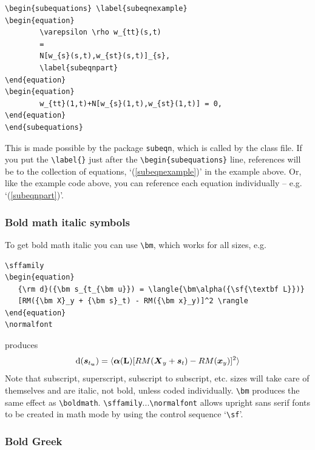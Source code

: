 \documentclass[]{tRSL2e}
\begin{document}
\begin{verbatim}
\begin{subequations} \label{subeqnexample}
\begin{equation}
        \varepsilon \rho w_{tt}(s,t)
        =
        N[w_{s}(s,t),w_{st}(s,t)]_{s},
        \label{subeqnpart}
\end{equation}
\begin{equation}
        w_{tt}(1,t)+N[w_{s}(1,t),w_{st}(1,t)] = 0,
\end{equation}
\end{subequations}
\end{verbatim}
This is made possible by the package {\tt{subeqn}}, which is called
by the class file. If you put the \verb"\label{}" just after the
\verb"\begin{subequations}" line, references will be to the
collection of equations, `(\ref{subeqnexample})' in the example
above. Or, like the example code above, you can reference each
equation individually -- e.g. `(\ref{subeqnpart})'.


\subsubsection{Bold math italic symbols}

To get bold math italic you can use \verb"\bm", which works for
all sizes, e.g.
%
\begin{verbatim}
\sffamily
\begin{equation}
   {\rm d}({\bm s_{t_{\bm u}}) = \langle{\bm\alpha({\sf{\textbf L}})}
   [RM({\bm X}_y + {\bm s}_t) - RM({\bm x}_y)]^2 \rangle
\end{equation}
\normalfont
\end{verbatim}
%
produces\sffamily
\begin{equation}
   {\rm d}({\bm s_{t_{\bm u}}}) = \langle {\bm\alpha({\sf{\textbf L}})}[RM({\bm X}_y
   + {\bm s}_t) - RM({\bm x}_y)]^2 \rangle
\end{equation}\normalfont
Note that subscript, superscript, subscript to subscript, etc.
sizes will take care of themselves and are italic, not bold,
unless coded individually. \verb"\bm" produces the same effect as
\verb"\boldmath". \verb"\sffamily"...\verb"\normalfont" allows
upright sans serif fonts to be created in math mode by using the
control sequence `\verb"\sf"'.


\subsubsection{Bold Greek}\label{boldgreek}
\end{document}

